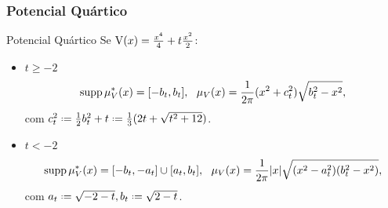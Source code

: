 \begin{frame}[t]
	
\end{frame}

\begin{frame}
	\frametitle{Potencial Quártico}
	\begin{block}{Potencial Quártico}
		Se $\operatorname{V}(x) = \frac{x^4}{4} + t \frac{x^2}{2}$:
		\begin{itemize}
			\item \(t \geq -2\)
			\[
			\supp \mu^*_V(x) = [-b_t, b_t], \ \ \mu_V(x) = \frac{1}{2\pi} (x^2 + c_t^2) \sqrt{b_t^2 - x^2},\label{Equação: Quartico +}
			\]
			com $c_t^2 \deff\frac{1}{2} b_t^2 + t \deff \frac{1}{3} (2t + \sqrt{t^2 + 12})$.
			\pause
			\item \(t < -2\)
			\[
			\operatorname{supp} \mu^*_V(x) = [-b_t, -a_t] \cup [a_t, b_t], \ \ \mu_V(x) = \frac{1}{2\pi} |x| \sqrt{(x^2 - a_t^2)(b_t^2 - x^2)},
			\label{Equação: Quartico -}
			\]
			com $ a_t \deff \sqrt{-2-t}, b_t \deff \sqrt{2-t}$.
		\end{itemize}
	\end{block}
\end{frame}

